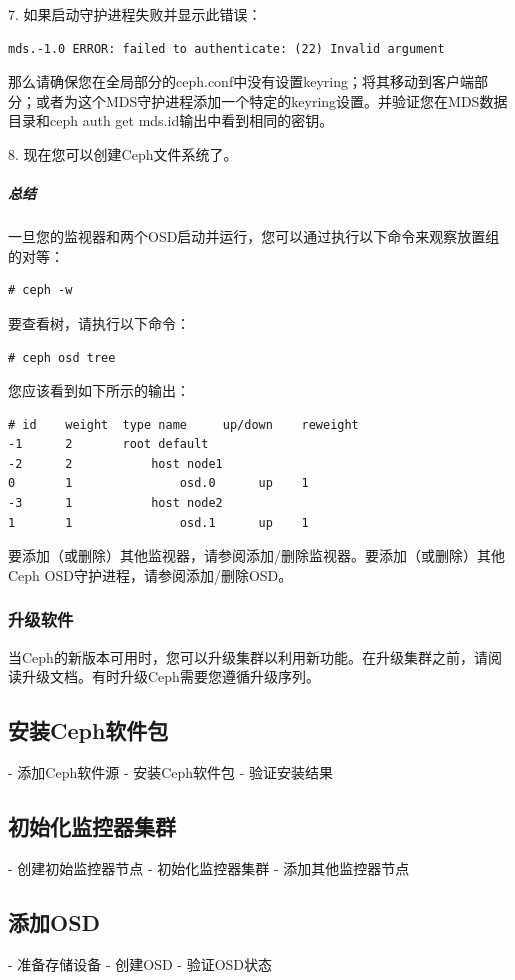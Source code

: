 \documentclass[12pt,UTF8]{ctexbook}
\begin{document}
7. 如果启动守护进程失败并显示此错误：
\begin{verbatim}
mds.-1.0 ERROR: failed to authenticate: (22) Invalid argument
\end{verbatim}

那么请确保您在全局部分的ceph.conf中没有设置keyring；将其移动到客户端部分；或者为这个MDS守护进程添加一个特定的keyring设置。并验证您在MDS数据目录和ceph auth get mds.{id}输出中看到相同的密钥。

8. 现在您可以创建Ceph文件系统了。

\subparagraph{总结}
一旦您的监视器和两个OSD启动并运行，您可以通过执行以下命令来观察放置组的对等：
\begin{verbatim}
# ceph -w
\end{verbatim}

要查看树，请执行以下命令：
\begin{verbatim}
# ceph osd tree
\end{verbatim}

您应该看到如下所示的输出：
\begin{verbatim}
# id    weight  type name     up/down    reweight
-1      2       root default
-2      2           host node1
0       1               osd.0      up    1
-3      1           host node2
1       1               osd.1      up    1
\end{verbatim}

要添加（或删除）其他监视器，请参阅添加/删除监视器。要添加（或删除）其他Ceph OSD守护进程，请参阅添加/删除OSD。

\subsubsection{升级软件}
当Ceph的新版本可用时，您可以升级集群以利用新功能。在升级集群之前，请阅读升级文档。有时升级Ceph需要您遵循升级序列。

\subsection{安装Ceph软件包}
- 添加Ceph软件源
- 安装Ceph软件包
- 验证安装结果

\subsection{初始化监控器集群}
- 创建初始监控器节点
- 初始化监控器集群
- 添加其他监控器节点

\subsection{添加OSD}
- 准备存储设备
- 创建OSD
- 验证OSD状态
\end{document}
